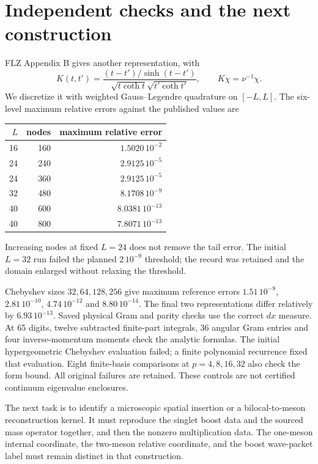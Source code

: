 \documentclass[11pt,a4paper]{article}
\begin{document}
\newpage
\appendix
\section{Independent checks and the next construction}
FLZ Appendix B gives another representation, with
\begin{equation}
 K(t,t')=\frac{(t-t')/\sinh(t-t')}
 {\sqrt{t\coth t}\sqrt{t'\coth t'}},\qquad
 K\chi=\nu^{-1}\chi.
\end{equation}
We discretize it with weighted Gauss--Legendre quadrature on $[-L,L]$.
The six-level maximum relative errors against the published values are
\begin{center}
\begin{tabular}{rrr}
\toprule
$L$ & nodes & maximum relative error\\\midrule
16&160&$1.5020\,10^{-2}$\\
24&240&$2.9125\,10^{-5}$\\
24&360&$2.9125\,10^{-5}$\\
32&480&$8.1708\,10^{-9}$\\
40&600&$8.0381\,10^{-13}$\\
40&800&$7.8071\,10^{-13}$\\\bottomrule
\end{tabular}
\end{center}
Increasing nodes at fixed $L=24$ does not remove the tail error. The
initial $L=32$ run failed the planned $2\,10^{-9}$ threshold; the record
was retained and the domain enlarged without relaxing the threshold.

Chebyshev sizes $32,64,128,256$ give maximum reference errors
$1.51\,10^{-8}$, $2.81\,10^{-10}$, $4.74\,10^{-12}$ and
$8.80\,10^{-14}$. The final two representations differ relatively by
$6.93\,10^{-13}$. Saved physical Gram and parity checks use the
correct $dx$ measure. At 65 digits, twelve subtracted finite-part
integrals, 36 angular Gram entries and four inverse-momentum moments
check the analytic formulas. The initial hypergeometric Chebyshev
evaluation failed; a finite polynomial recurrence fixed that evaluation.
Eight finite-basis comparisons at $p=4,8,16,32$ also check the form
bound. All original failures are retained. These controls are not certified
continuum eigenvalue enclosures.

The next task is to identify a microscopic spatial insertion or a
bilocal-to-meson reconstruction kernel. It must reproduce the singlet
boost data and the sourced mass operator together, and then the
nonzero multiplication data. The one-meson internal coordinate, the
two-meson relative coordinate, and the boost wave-packet label must
remain distinct in that construction.
\end{document}
